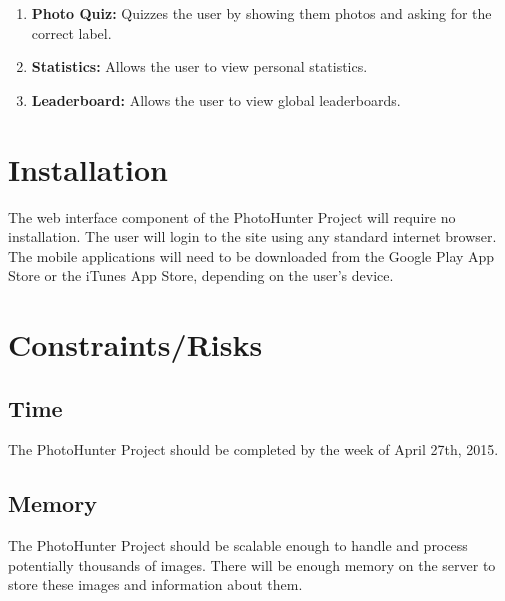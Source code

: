 \documentclass{article}
\begin{document}
\begin{enumerate}

  \item \textbf {Photo Quiz:} Quizzes the user by showing them photos and
        asking for the correct label.

  \item \textbf{Statistics:} Allows the user to view personal statistics.

  \item \textbf{Leaderboard:} Allows the user to view global leaderboards.

\end{enumerate}
	 
\section{Installation}
The web interface component of the PhotoHunter Project will require no
installation. The user will login to the site using any standard internet
browser. The mobile applications will need to be downloaded from the Google
Play App Store or the iTunes App Store, depending on the user's device.

\section{Constraints/Risks}

\subsection{Time}
The PhotoHunter Project should be completed by the week of April 27th, 2015.

\subsection{Memory}
The PhotoHunter Project should be scalable enough to handle and process potentially
thousands of images. There will be enough memory on the server to store these images
and information about them.



%
%

\end{document}
